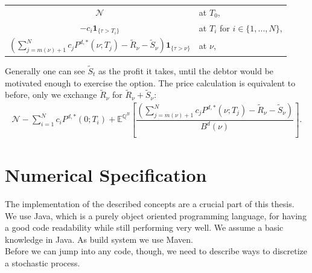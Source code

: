 \documentclass[12pt]{article}
\begin{document}
	\begin{center}
		\begin{tabular}{cl}
			$\mathcal{N}$ & at $T_0$, \\
			$-c_i\mathbf{1}_{\{\tau > T_i\}}$ 		  & at $T_i$ for $i \in \{1, ..., N\}$, \\
			$\left(\sum_{j=m(\nu)+1}^{N}c_jP^{d,*}(\nu;T_j) - \tilde{R}_\nu - \tilde{S}_\nu\right)\mathbf{1}_{\{\tau > \nu\}}$
			& at $\nu$,
		\end{tabular}
	\end{center}
	
	Generally one can see $\tilde{S}_t$ as the profit it takes, until the debtor would be motivated enough to exercise the option. The price calculation is equivalent to before, only we exchange $\tilde{R}_\nu$ for $\tilde{R}_\nu + \tilde{S}_\nu$:
	\begin{align*}
		\mathcal{N} -\sum_{i=1}^{N}c_iP^{d,*}(0;T_i) +  \mathbb{E}^{\mathbb{Q}^B}\left[\dfrac{\left(\sum_{j=m(\nu)+1}^{N}c_jP^{d,*}(\nu;T_j) - \tilde{R}_\nu - \tilde{S}_\nu\right)}{B^d(\nu)}\right].
	\end{align*}
	
	
	
	
	
	
	\pagebreak
	\section{Numerical Specification}\label{sec:numerical}
	The implementation of the described concepts are a crucial part of this thesis.\\
	We use Java, which is a purely object oriented programming language, for having a good  code readability while still performing very well. We assume a basic knowledge in Java.
	As build system we use Maven.\\
	Before we can jump into any code, though, we need to describe ways to discretize a stochastic process.
	
\end{document}
